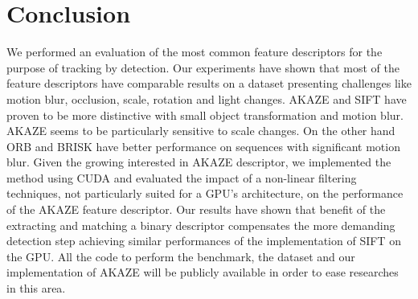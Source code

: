 \section{Conclusion}

We performed an evaluation of the most common feature descriptors for the purpose of tracking by detection. Our experiments have shown that most of the feature descriptors have comparable results on a dataset presenting challenges like motion blur, occlusion, scale, rotation and light changes. AKAZE and SIFT have proven to be more distinctive with small object transformation and motion blur. AKAZE seems to be particularly sensitive to scale changes. On the other hand ORB and BRISK have better performance on sequences with significant motion blur. Given the growing interested in AKAZE descriptor, we implemented the method using CUDA and evaluated the impact of a non-linear filtering techniques, not particularly suited for a GPU's architecture, on the performance of the AKAZE feature descriptor. Our results have shown that benefit of the extracting and matching a binary descriptor compensates the more demanding detection step achieving similar performances of the implementation of SIFT on the GPU. All the code to perform the benchmark, the dataset and our implementation of AKAZE will be publicly available in order to ease researches in this area.

